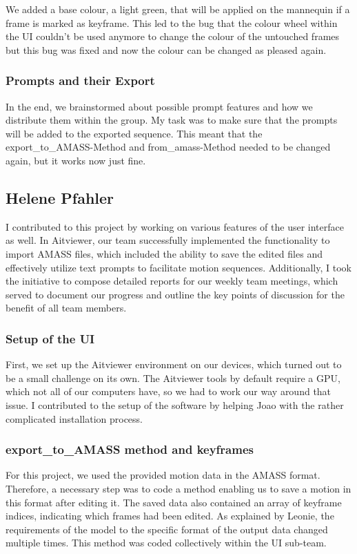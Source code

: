\documentclass[a4paper]{scrartcl}
\begin{document}
We added a base colour, a light green, that will be applied on the mannequin if a frame is marked as keyframe. This led to the bug that the colour wheel within the UI couldn't be used anymore to change the colour of the untouched frames but this bug was fixed and now the colour can be changed as pleased again.

\subsubsection*{Prompts and their Export}
In the end, we brainstormed about possible prompt features and how we distribute them within the group. My task was to make sure that the prompts will be added to the exported sequence. This meant that the export\_to\_AMASS-Method and from\_amass-Method needed to be changed again, but it works now just fine.  


\subsection*{Helene Pfahler}
I contributed to this project by working on various features of the user interface as well. In Aitviewer, our team successfully implemented the functionality to import AMASS files, which included the ability to save the edited files and effectively utilize text prompts to facilitate motion sequences.  
Additionally, I took the initiative to compose detailed reports for our weekly team meetings, which served to document our progress and outline the key points of discussion for the benefit of all team members.  

\subsubsection*{Setup of the UI}  
First, we set up the Aitviewer environment on our devices, which turned out to be a small challenge on its own. The Aitviewer tools by default require a GPU, which not all of our computers have, so we had to work our way around that issue. I contributed to the setup of the software by helping Joao with the rather complicated installation process.

\subsubsection*{export\_to\_AMASS method and keyframes}
For this project, we used the provided motion data in the AMASS format. Therefore, a necessary step was to code a method enabling us to save a motion in this format after editing it. The saved data also contained an array of keyframe indices, indicating which frames had been edited. As explained by Leonie, the requirements of the model to the specific format of the output data changed multiple times. This method was coded collectively within the UI sub-team.  
\end{document}
